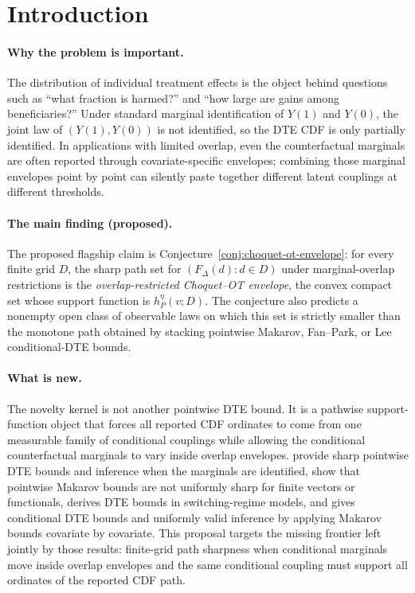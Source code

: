 \documentclass[11pt]{article}
\theoremstyle{definition}
\theoremstyle{plain}
\theoremstyle{remark}
\begin{document}
\section{Introduction}
\paragraph{Why the problem is important.}
The distribution of individual treatment effects is the object behind questions such as
``what fraction is harmed?'' and ``how large are gains among beneficiaries?''  Under
standard marginal identification of \(Y(1)\) and \(Y(0)\), the joint law of
\((Y(1),Y(0))\) is not identified, so the DTE CDF is only partially identified.  In
applications with limited overlap, even the counterfactual marginals are often reported
through covariate-specific envelopes; combining those marginal envelopes point by point
can silently paste together different latent couplings at different thresholds.

\paragraph{The main finding (proposed).}
The proposed flagship claim is Conjecture~\ref{conj:choquet-ot-envelope}: for every
finite grid \(D\), the sharp path set for
\((F_\Delta(d):d\in D)\) under marginal-overlap restrictions is the
\emph{overlap-restricted Choquet--OT envelope}, the convex compact set whose support
function is \(h^\eta_P(v;D)\).  The conjecture also predicts a nonempty open class of
observable laws on which this set is strictly smaller than the monotone path obtained by
stacking pointwise Makarov, Fan--Park, or Lee conditional-DTE bounds.

\paragraph{What is new.}
The novelty kernel is not another pointwise DTE bound.  It is a pathwise support-function
object that forces all reported CDF ordinates to come from one measurable family of
conditional couplings while allowing the conditional counterfactual marginals to vary
inside overlap envelopes.  \citet[Section 2]{FanPark2010} provide sharp pointwise DTE
bounds and inference when the marginals are identified,
\citet[Section 2]{FirpoRidder2019} show that pointwise Makarov bounds are not uniformly
sharp for finite vectors or functionals, \citet[Sections 2--3]{FanWu2010} derives DTE
bounds in switching-regime models, and \citet[Sections 2--3]{Lee2024} gives conditional
DTE bounds and uniformly valid inference by applying Makarov bounds covariate by covariate.
This proposal targets the missing frontier left jointly by those results: finite-grid
path sharpness when conditional marginals move inside overlap envelopes and the same
conditional coupling must support all ordinates of the reported CDF path.
\end{document}
